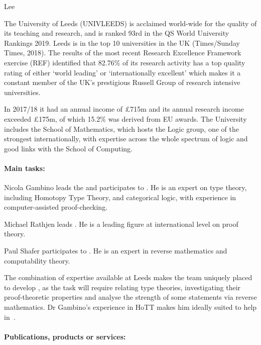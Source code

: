 \begin{sitedescription}{Lee}


The University of Leeds (UNIVLEEDS) is acclaimed world-wide for the quality of its teaching and research, and is ranked 93rd in the QS World University Rankings 2019. Leeds is in the top 10 universities in the UK (Times/Sunday Times, 2018). The results of the most recent Research Excellence Framework exercise (REF) identified that 82.76\% 
of its research activity has a top quality rating of either `world leading' or `internationally excellent' which makes it a constant member of the UK's prestigious Russell Group of research intensive universities. 

In 2017/18 it had an annual income of \pounds 715m and its annual research income exceeded \pounds 175m, of which 15.2\% was derived from EU awards. The University includes the School of Mathematics,
which hosts the Logic group, one of the strongest internationally, with expertise across the whole
spectrum of logic and good links with the School of Computing.




\paragraph*{Main tasks:}

\begin{compactitem}
\item Nicola Gambino leads  the  and participates to . He is an expert on type theory,
including Homotopy Type Theory, and categorical logic, with experience in computer-assisted proof-checking. 
\item Michael Rathjen leads . He is a leading figure at international level
on proof theory. 
\item Paul Shafer participates to  . He is an expert in reverse mathematics
and computability theory.
\end{compactitem}
The combination of expertise available at Leeds makes the team uniquely placed to develop  ,
as the task will require relating type theories, investigating their proof-theoretic properties and analyse the strength of some
statements via reverse mathematics. Dr Gambino's experience in HoTT makes him ideally suited to help in~.


\paragraph*{Publications, products or services:} 


\end{sitedescription}
